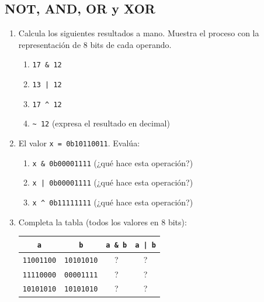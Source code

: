 \documentclass[12pt, oneside]{article}
\begin{document}
\subsection{NOT, AND, OR y XOR}

\begin{enumerate}[resume]

  \item Calcula los siguientes resultados a mano. Muestra el proceso con
        la representación de 8 bits de cada operando.
        \begin{enumerate}
          \item \texttt{17 \& 12}
          \item \texttt{13 | 12}
          \item \texttt{17 \textasciicircum{} 12}
          \item \texttt{\textasciitilde{} 12}
                (expresa el resultado en decimal)
        \end{enumerate}

  \item El valor \texttt{x = 0b10110011}. Evalúa:
        \begin{enumerate}
          \item \texttt{x \& 0b00001111} \quad (¿qué hace esta operación?)
          \item \texttt{x | 0b00001111} \quad (¿qué hace esta operación?)
          \item \texttt{x \textasciicircum{} 0b11111111}
                \quad (¿qué hace esta operación?)
        \end{enumerate}

  \item Completa la tabla (todos los valores en 8 bits):
        \begin{center}
        \begin{tabular}{cccc}
          \toprule
          \texttt{a} & \texttt{b} & \texttt{a \& b} & \texttt{a | b} \\
          \midrule
          \texttt{11001100} & \texttt{10101010} & ? & ? \\
          \texttt{11110000} & \texttt{00001111} & ? & ? \\
          \texttt{10101010} & \texttt{10101010} & ? & ? \\
          \bottomrule
        \end{tabular}
        \end{center}

\end{enumerate}
\end{document}

